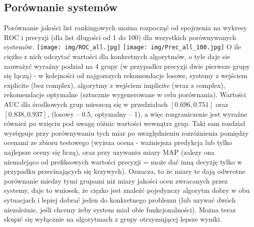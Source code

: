\documentclass{pracamgr}
\begin{document}
   \subsection{Porównanie systemów}
    Porównanie jakości list rankingowych można rozpocząć od spojrzenia na wykresy ROC i precyzji (dla list długości od 1 do 100)
    dla wszystkich porównywanych systemów.\newline
    \texttt{[image: img/ROC\_all.jpg]}
    \texttt{[image: img/Prec\_all\_100.jpg]}\newline
    O ile ciężko z nich odczytać wartości dla konkretnych algorytmów, o tyle daje sie zauważyć wyraźny podział na 4 grupy
    (w przypadku precyzji dwie pierwsze grupy się łączą) - w kolejności od najgorszych
    rekomendacje losowe, systemy z wejściem explicite (bez complex), algorytmy z wejściem implicite (wraz z complex), rekomendacje optymalne
    (sztucznie wygenerowane w celu porównania). Wartości AUC dla środkowych grup mieszczą się w przedziałach $[0.696,0.751]$ oraz $[0.838,0.937]$,
    (losowy -- 0.5, optymalny -- 1), a więc rozgraniczenie jest wyraźne również po wzięciu pod uwagę różnic wartości wewnątrz grup.
    Taki sam rozdział występuje przy porównywaniu tych miar po uwzględnieniu rozróżnienia pomiędzy ocenami
    ze zbioru testowego (wyższa ocena - ważniejsza predykcja lub tylko najlepsze oceny się liczą), oraz przy uzywaniu miary MAP
    (zalezy ona niemalejąco od prefiksowych wartości precyzji = może dać inną decyzję tylko w przypadku przecinających się krzywych).
    Oznacza, to że miary te dają odwrotne porównanie miedzy tymi grupami niż miary jakości ocen zwracanych przez systemy, daje to wniosek,
    że cięzko jest znaleźć pojedynczy algorytm dobry w obu sytuacjach i lepiej dobrać jeden do konkretnego problemu
    (lub uzywać dwóch niezależnie, jeśli chcemy żeby system miał obie funkcjonalności).
    Można teraz skupić się wyłącznie na algorytmach z grupy otrzymującej lepsze wyniki.\newline
\end{document}
